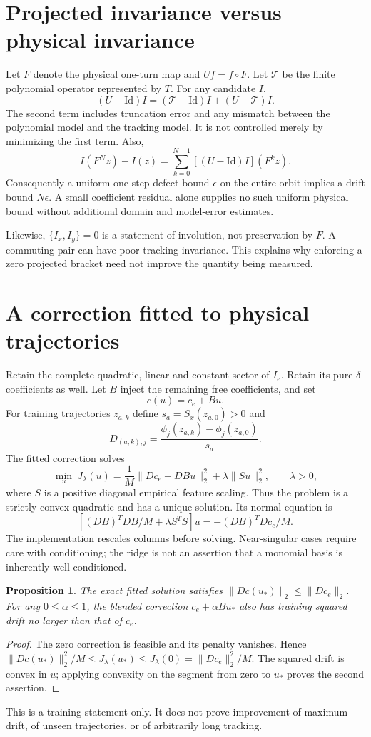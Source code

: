 \documentclass[11pt]{article}
\newtheorem{proposition}{Proposition}
\begin{document}
\section{Projected invariance versus physical invariance}
Let $F$ denote the physical one-turn map and $U f=f\circ F$. Let $\mathcal T$ be the finite polynomial operator represented by $T$. For any candidate $I$,
\[
 (U-\mathrm{Id})I=(\mathcal T-\mathrm{Id})I+(U-\mathcal T)I.
\]
The second term includes truncation error and any mismatch between the polynomial model and the tracking model. It is not controlled merely by minimizing the first term. Also,
\[
 I(F^Nz)-I(z)=\sum_{k=0}^{N-1}[(U-\mathrm{Id})I](F^kz).
\]
Consequently a uniform one-step defect bound $\epsilon$ on the entire orbit implies a drift bound $N\epsilon$. A small coefficient residual alone supplies no such uniform physical bound without additional domain and model-error estimates.

Likewise, $\{I_x,I_y\}=0$ is a statement of involution, not preservation by $F$. A commuting pair can have poor tracking invariance. This explains why enforcing a zero projected bracket need not improve the quantity being measured.

\section{A correction fitted to physical trajectories}
Retain the complete quadratic, linear and constant sector of $I_e$. Retain its pure-$\delta$ coefficients as well. Let $B$ inject the remaining free coefficients, and set
\[
 c(u)=c_e+Bu.
\]
For training trajectories $z_{a,k}$ define $s_a=S_x(z_{a,0})>0$ and
\[
 D_{(a,k),j}=\frac{\phi_j(z_{a,k})-\phi_j(z_{a,0})}{s_a}.
\]
The fitted correction solves
\[
 \min_u\ J_\lambda(u)
 =\frac1M\|Dc_e+DBu\|_2^2+\lambda\|Su\|_2^2,
 \qquad \lambda>0,
\]
where $S$ is a positive diagonal empirical feature scaling. Thus the problem is a strictly convex quadratic and has a unique solution. Its normal equation is
\[
 [(DB)^TDB/M+\lambda S^TS]u=-(DB)^TDc_e/M.
\]
The implementation rescales columns before solving. Near-singular cases require care with conditioning; the ridge is not an assertion that a monomial basis is inherently well conditioned.

\begin{proposition}
The exact fitted solution satisfies $\|Dc(u_*)\|_2\leq\|Dc_e\|_2$. For any $0\leq\alpha\leq1$, the blended correction $c_e+\alpha Bu_*$ also has training squared drift no larger than that of $c_e$.
\end{proposition}
\begin{proof}
The zero correction is feasible and its penalty vanishes. Hence
$\|Dc(u_*)\|_2^2/M\leq J_\lambda(u_*)\leq J_\lambda(0)=\|Dc_e\|_2^2/M$.
The squared drift is convex in $u$; applying convexity on the segment from zero to $u_*$ proves the second assertion.
\end{proof}
This is a training statement only. It does not prove improvement of maximum drift, of unseen trajectories, or of arbitrarily long tracking.
\end{document}
